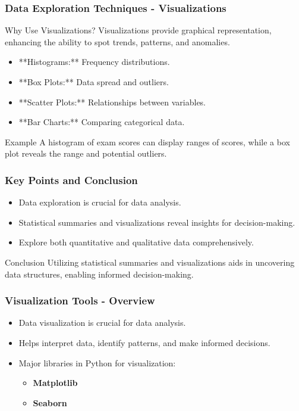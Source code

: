 \documentclass[aspectratio=169]{beamer}
\begin{document}
\begin{frame}[fragile]
    \frametitle{Data Exploration Techniques - Visualizations}
    \begin{block}{Why Use Visualizations?}
        Visualizations provide graphical representation, enhancing the ability to spot trends, patterns, and anomalies.
    \end{block}
    \begin{itemize}
        \item **Histograms:** Frequency distributions.
        \item **Box Plots:** Data spread and outliers.
        \item **Scatter Plots:** Relationships between variables.
        \item **Bar Charts:** Comparing categorical data.
    \end{itemize}
    \begin{block}{Example}
        A histogram of exam scores can display ranges of scores, while a box plot reveals the range and potential outliers.
    \end{block}
\end{frame}

\begin{frame}[fragile]
    \frametitle{Key Points and Conclusion}
    \begin{itemize}
        \item Data exploration is crucial for data analysis.
        \item Statistical summaries and visualizations reveal insights for decision-making.
        \item Explore both quantitative and qualitative data comprehensively.
    \end{itemize}
    
    \begin{block}{Conclusion}
        Utilizing statistical summaries and visualizations aids in uncovering data structures, enabling informed decision-making.
    \end{block}
\end{frame}

\begin{frame}[fragile]
    \frametitle{Visualization Tools - Overview}
    \begin{itemize}
        \item Data visualization is crucial for data analysis.
        \item Helps interpret data, identify patterns, and make informed decisions.
        \item Major libraries in Python for visualization:
        \begin{itemize}
            \item \textbf{Matplotlib}
            \item \textbf{Seaborn}
        \end{itemize}
    \end{itemize}
\end{frame}
\end{document}
